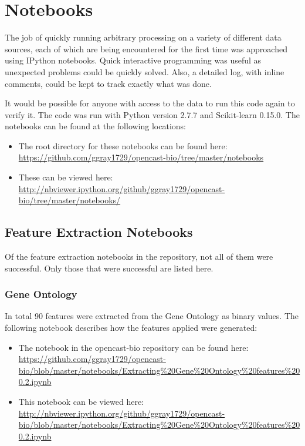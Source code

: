 \chapter{Notebooks}
\label{app:notebooks}

The job of quickly running arbitrary processing on a variety of different data sources, each of which are being encountered for the first time was approached using IPython notebooks.
Quick interactive programming was useful as unexpected problems could be quickly solved.
Also, a detailed log, with inline comments, could be kept to track exactly what was done.

It would be possible for anyone with access to the data to run this code again to verify it.
The code was run with Python version 2.7.7 and Scikit-learn 0.15.0.
The notebooks can be found at the following locations:

\begin{itemize}
    \item The root directory for these notebooks can be found here: \url{https://github.com/ggray1729/opencast-bio/tree/master/notebooks}
    \item These can be viewed here: \url{http://nbviewer.ipython.org/github/ggray1729/opencast-bio/tree/master/notebooks/}
\end{itemize}

\section{Feature Extraction Notebooks}

Of the feature extraction notebooks in the repository, not all of them were successful.
Only those that were successful are listed here.

\subsection{Gene Ontology}
\label{app:go}

In total 90 features were extracted from the Gene Ontology as binary values.
The following notebook describes how the features applied were generated:

\begin{itemize}
    \item The notebook in the opencast-bio repository can be found here: \url{https://github.com/ggray1729/opencast-bio/blob/master/notebooks/Extracting%20Gene%20Ontology%20features%200.2.ipynb}
        \item This notebook can be viewed here: \url{http://nbviewer.ipython.org/github/ggray1729/opencast-bio/blob/master/notebooks/Extracting%20Gene%20Ontology%20features%200.2.ipynb}
\end{itemize}

